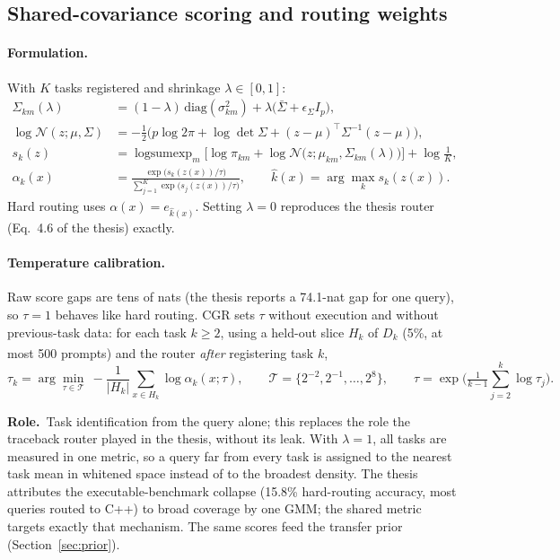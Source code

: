 \documentclass[11pt]{article}
\newcommand{\T}{^{\top}}
\newcommand{\tagnew}{\textsuperscript{\textcolor{orange!80!black}{\sffamily[new]}}}
\newcommand{\role}{\par\noindent\textbf{Role.}\ }
\begin{document}
\subsection{Shared-covariance scoring and routing weights}\label{sec:score}

\paragraph{Formulation.} With $K$ tasks registered and shrinkage $\lambda\in[0,1]$:
\begin{align}
  \Sigma_{km}(\lambda) &= (1-\lambda)\,\mathrm{diag}(\sigma^2_{km})+\lambda\big(\bar\Sigma+\epsilon_\Sigma I_p\big),\\
  \log\mathcal N(z;\mu,\Sigma) &= -\tfrac12\Big(p\log 2\pi+\log\det\Sigma+(z-\mu)\T\Sigma^{-1}(z-\mu)\Big),\\
  s_k(z) &= \operatorname{logsumexp}_{m}\Big[\log\pi_{km}+\log\mathcal N\big(z;\mu_{km},\Sigma_{km}(\lambda)\big)\Big]+\log\tfrac1K,\label{eq:score}\\
  \alpha_k(x) &= \frac{\exp\big(s_k(z(x))/\tau\big)}{\sum_{j=1}^{K}\exp\big(s_j(z(x))/\tau\big)},\qquad
  \hat k(x)=\arg\max_k s_k(z(x)).
\end{align}
Hard routing uses $\alpha(x)=e_{\hat k(x)}$. Setting $\lambda=0$ reproduces the thesis router (Eq.~4.6 of the thesis)
exactly.

\paragraph{Temperature calibration.} Raw score gaps are tens of nats (the thesis reports a 74.1-nat gap for one
query), so $\tau=1$ behaves like hard routing. CGR sets $\tau$ without execution and without previous-task data:
for each task $k\ge2$, using a held-out slice $H_k$ of $D_k$ (5\%, at most 500 prompts\tagnew) and the router
\emph{after} registering task $k$,
\begin{equation}
  \tau_k=\arg\min_{\tau\in\mathcal T}\ -\frac{1}{|H_k|}\sum_{x\in H_k}\log\alpha_k(x;\tau),\qquad
  \mathcal T=\{2^{-2},2^{-1},\dots,2^{8}\},\qquad
  \tau=\exp\Big(\tfrac{1}{k-1}\textstyle\sum_{j=2}^{k}\log\tau_j\Big).
\end{equation}

\role Task identification from the query alone; this replaces the role the traceback router played in the thesis,
without its leak. With $\lambda=1$, all tasks are measured in one metric, so a query far from every task is
assigned to the nearest task mean in whitened space instead of to the broadest density. The thesis attributes the
executable-benchmark collapse (15.8\% hard-routing accuracy, most queries routed to C++) to broad coverage by one
GMM; the shared metric targets exactly that mechanism. The same scores feed the transfer prior
(Section~\ref{sec:prior}).
\end{document}

